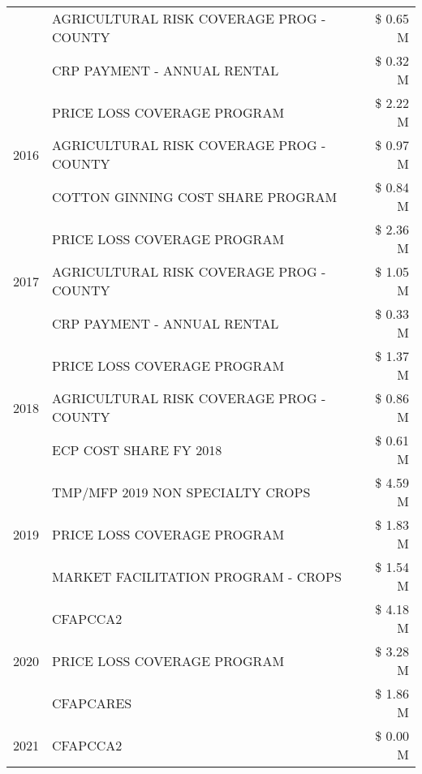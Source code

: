 \begin{tabular}{llr}
 & AGRICULTURAL RISK COVERAGE PROG - COUNTY & \$ 0.65 M \\
 & CRP PAYMENT - ANNUAL RENTAL & \$ 0.32 M \\
\cline{1-3}
\multirow[t]{3}{*}{2016} & PRICE LOSS COVERAGE PROGRAM                   & \$ 2.22 M \\
 & AGRICULTURAL RISK COVERAGE PROG - COUNTY      & \$ 0.97 M \\
 & COTTON GINNING COST SHARE PROGRAM             & \$ 0.84 M \\
\cline{1-3}
\multirow[t]{3}{*}{2017} & PRICE LOSS COVERAGE PROGRAM & \$ 2.36 M \\
 & AGRICULTURAL RISK COVERAGE PROG - COUNTY & \$ 1.05 M \\
 & CRP PAYMENT - ANNUAL RENTAL & \$ 0.33 M \\
\cline{1-3}
\multirow[t]{3}{*}{2018} & PRICE LOSS COVERAGE PROGRAM & \$ 1.37 M \\
 & AGRICULTURAL RISK COVERAGE PROG - COUNTY & \$ 0.86 M \\
 & ECP COST SHARE FY 2018 & \$ 0.61 M \\
\cline{1-3}
\multirow[t]{3}{*}{2019} & TMP/MFP 2019 NON SPECIALTY CROPS & \$ 4.59 M \\
 & PRICE LOSS COVERAGE PROGRAM & \$ 1.83 M \\
 & MARKET FACILITATION PROGRAM - CROPS & \$ 1.54 M \\
\cline{1-3}
\multirow[t]{3}{*}{2020} & CFAPCCA2 & \$ 4.18 M \\
 & PRICE LOSS COVERAGE PROGRAM & \$ 3.28 M \\
 & CFAPCARES & \$ 1.86 M \\
\cline{1-3}
2021 & CFAPCCA2 & \$ 0.00 M \\
\cline{1-3}
\bottomrule
\end{tabular}
